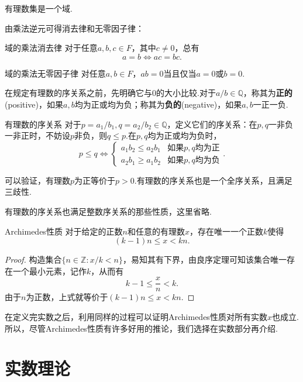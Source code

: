 \documentclass[lang=cn, zihao=5]{elegantbook}
\newcommand{\Z}{\mathbb{Z}}
\begin{document}
有理数集是一个域.

由乘法逆元可得消去律和无零因子律：

\begin{proposition}{域的乘法消去律}
	对于任意$a,b,c \in F$，其中$c \neq 0$，总有$$a=b \Leftrightarrow ac=bc.$$
\end{proposition}

\begin{corollary}{域的乘法无零因子律}
	对任意$a,b \in F$，$ab=0$当且仅当$a=0$或$b=0$.
\end{corollary}

在规定有理数的序关系之前，先明确它与$0$的大小比较.对于$a/b \in \mathbb{Q}$，称其为\textbf{正的}(positive)，如果$a,b$均为正或均为负；称其为\textbf{负的}(negative)，如果$a,b$一正一负.

\begin{definition}{有理数的序关系}
	对于$p=a_1/b_1,q=a_2/b_2 \in \mathbb{Q}$，定义它们的序关系：在$p,q$一非负一非正时，不妨设$p$非负，则$q \leq p$.在$p,q$均为正或均为负时，
	$$p \leq q \Leftrightarrow \begin{cases}
		a_1b_2 \leq a_2b_1 & \textit{如果$p,q$均为正} \\
		a_2b_1 \geq a_1b_2 & \textit{如果$p,q$均为负}
	\end{cases}.$$
\end{definition}

可以验证，有理数$p$为正等价于$p>0$.有理数的序关系也是一个全序关系，且满足三歧性.

有理数的序关系也满足整数序关系的那些性质，这里省略.

\begin{theorem}{Archimedes性质}
	对于给定的正数$n$和任意的有理数$x$，存在唯一一个正数$k$使得$$(k-1)n \leq x < kn.$$
\end{theorem}
\begin{proof}
	构造集合$\{ n \in \Z : x/k <n \}$，易知其有下界，由良序定理可知该集合唯一存在一个最小元素，记作$k$，从而有$$k-1 \leq \frac{x}{n} < k.$$
	由于$n$为正数，上式就等价于$(k-1)n \leq x < kn$.
\end{proof}

在定义完实数之后，利用同样的过程可以证明Archimedes性质对所有实数$x$也成立.所以，尽管Archimedes性质有许多好用的推论，我们选择在实数部分再介绍.



\chapter{实数理论}
\end{document}
